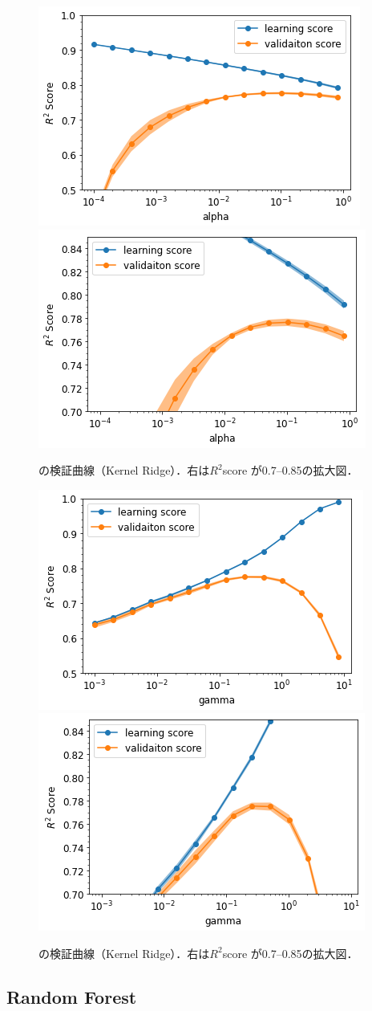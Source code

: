 \documentclass[10pt,a4paper,dvipdfmx]{jsarticle}
\begin{document}
\begin{figure}[ht]
   \centering
   \includegraphics[keepaspectratio, width=0.45\linewidth]{2021-07-28-00-41-04.png}
   \includegraphics[keepaspectratio, width=0.45\linewidth]{2021-07-28-00-41-14.png}
   \caption{の検証曲線（Kernel Ridge）．右は$R^2$score が0.7--0.85の拡大図．}
   \label{fig:2}
\end{figure}
\begin{figure}[ht]
   \centering
   \includegraphics[keepaspectratio, width=0.45\linewidth]{2021-07-28-00-41-27.png}
   \includegraphics[keepaspectratio, width=0.45\linewidth]{2021-07-28-00-41-37.png}
   \caption{の検証曲線（Kernel Ridge）．右は$R^2$score が0.7--0.85の拡大図．}
   \label{fig:3}
\end{figure}

\subsection{Random Forest}
\end{document}
